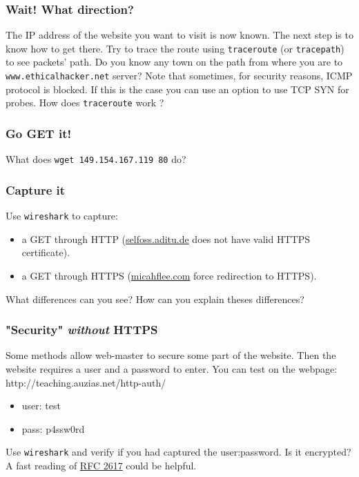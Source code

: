 \documentclass[11pt]{article}
\begin{document}
\subsubsection{Wait! What direction?}
The IP address of the website you want to visit is now known. The next step is to know how to get there. Try to trace the route using \verb"traceroute" (or \verb"tracepath") to see packets' path. Do you know any town on the path from where you are to \verb"www.ethicalhacker.net" server?
Note that sometimes, for security reasons, ICMP protocol is blocked. If this is the case you can use an option to use TCP SYN for probes.
How does \verb"traceroute" work ?

\subsubsection{Go GET it!}
What does \verb"wget 149.154.167.119 80" do?

\subsubsection{Capture it}
Use \verb"wireshark" to capture:
\begin{itemize}
  \item a GET through HTTP (\color{blue}\href{http://selfoss.aditu.de/}{selfoss.aditu.de}\color{black} does not have valid HTTPS certificate).
  \item a GET through HTTPS (\color{blue}\href{https://micahflee.com/}{micahflee.com}\color{black} force redirection to HTTPS).
\end{itemize}
What differences can you see? How can you explain theses differences?

\subsubsection{"Security" \emph{without} HTTPS}
Some methods allow web-master to secure some part of the website. Then the website requires a user and a password to enter. You can test on the webpage: http://teaching.auzias.net/http-auth/
\begin{itemize}
  \item user: test
  \item pass: p4ssw0rd
\end{itemize}
Use \verb"wireshark" and verify if you had captured the user:password. Is it encrypted? A fast reading of \color{blue}\href{http://tools.ietf.org/html/rfc2617}{RFC 2617}\color{black} could be helpful.
\end{document}
